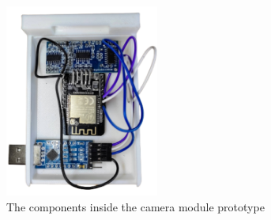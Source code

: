 \begin{figure}[H]
  \centering
  \includegraphics[width=0.45\textwidth]{img/Chap5/Prototype_View_inside.png}
  \caption{The components inside the camera module prototype}
\end{figure}

